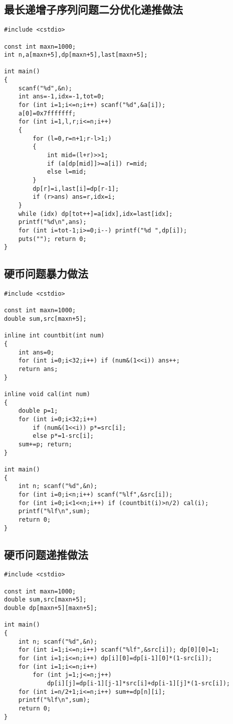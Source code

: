 \documentclass{article}
\begin{document}
\subsection{最长递增子序列问题二分优化递推做法}

\begin{lstlisting}
#include <cstdio>

const int maxn=1000;
int n,a[maxn+5],dp[maxn+5],last[maxn+5];

int main()
{
	scanf("%d",&n);
	int ans=-1,idx=-1,tot=0;
	for (int i=1;i<=n;i++) scanf("%d",&a[i]);
	a[0]=0x7fffffff;
	for (int i=1,l,r;i<=n;i++)
	{
		for (l=0,r=n+1;r-l>1;)
		{
			int mid=(l+r)>>1;
			if (a[dp[mid]]>=a[i]) r=mid;
			else l=mid;
		}
		dp[r]=i,last[i]=dp[r-1];
		if (r>ans) ans=r,idx=i;
	}
	while (idx) dp[tot++]=a[idx],idx=last[idx];
	printf("%d\n",ans);
	for (int i=tot-1;i>=0;i--) printf("%d ",dp[i]);
	puts(""); return 0;
}
\end{lstlisting}

\subsection{硬币问题暴力做法}

\begin{lstlisting}
#include <cstdio>

const int maxn=1000;
double sum,src[maxn+5];

inline int countbit(int num)
{
    int ans=0;
    for (int i=0;i<32;i++) if (num&(1<<i)) ans++;
    return ans;
}

inline void cal(int num)
{
    double p=1;
    for (int i=0;i<32;i++)
        if (num&(1<<i)) p*=src[i];
        else p*=1-src[i];
    sum+=p; return;
}

int main()
{
    int n; scanf("%d",&n);
    for (int i=0;i<n;i++) scanf("%lf",&src[i]);
    for (int i=0;i<1<<n;i++) if (countbit(i)>n/2) cal(i);
    printf("%lf\n",sum);
    return 0;
}
\end{lstlisting}

\subsection{硬币问题递推做法}

\begin{lstlisting}
#include <cstdio>

const int maxn=1000;
double sum,src[maxn+5];
double dp[maxn+5][maxn+5];

int main()
{
    int n; scanf("%d",&n);
    for (int i=1;i<=n;i++) scanf("%lf",&src[i]); dp[0][0]=1;
    for (int i=1;i<=n;i++) dp[i][0]=dp[i-1][0]*(1-src[i]);
    for (int i=1;i<=n;i++)
        for (int j=1;j<=n;j++)
            dp[i][j]=dp[i-1][j-1]*src[i]+dp[i-1][j]*(1-src[i]);
    for (int i=n/2+1;i<=n;i++) sum+=dp[n][i];
    printf("%lf\n",sum);
    return 0;
}
\end{lstlisting}
\end{document}
